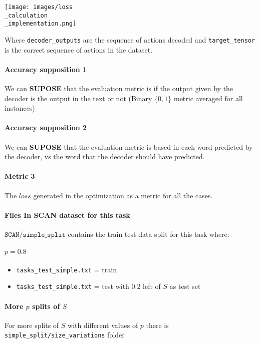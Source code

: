 \documentclass[]{article}
\begin{document}
\texttt{[image: images/loss\\\_calculation\\\_implementation.png]}

Where \texttt{decoder\_outputs} are the sequence of actions decoded and \texttt{target\_tensor} is the correct sequence of actions in the dataset.

\paragraph*{Accuracy supposition 1}
We can \textbf{SUPOSE} that the evaluation metric is if the output given by the decoder is the output in the text or not (Binary $\{0, 1\}$ metric averaged for all instances)

\paragraph*{Accuracy supposition 2}
We can \textbf{SUPOSE} that the evaluation metric is based in each word predicted by the decoder, vs the word that the decoder should have predicted.

\paragraph*{Metric 3}
The $loss$ generated in the optimization as a metric for all the cases.

\paragraph*{Files In SCAN dataset for this task\\}
$\texttt{SCAN/simple\_split}$ contains the train test data split for this task where:


\paragraph{$p = 0.8$}
\begin{itemize}
    \item \texttt{tasks\_test\_simple.txt} = train
    \item \texttt{tasks\_test\_simple.txt} = test with $0.2$ left of $S$ as test set
\end{itemize}

\paragraph*{More $p$ splits of $S$}
For more splits of $S$ with different values of $p$ there is \texttt{simple\_split/size\_variations} folder
\end{document}
